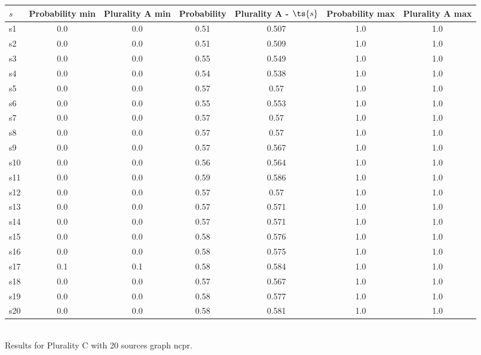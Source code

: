 \documentclass{article}
\begin{document}
\noindent\begin{tabular}{|l|c|c|c|c|c|c|}
\hline
$s$& Probability min & Plurality A min & Probability & Plurality A - $\ts{s}$ & Probability max & Plurality A max\\
\hline
s1 &0.0 & 0.0 & 0.51 & 0.507 & 1.0 & 1.0\\
\hline
s2 &0.0 & 0.0 & 0.51 & 0.509 & 1.0 & 1.0\\
\hline
s3 &0.0 & 0.0 & 0.55 & 0.549 & 1.0 & 1.0\\
\hline
s4 &0.0 & 0.0 & 0.54 & 0.538 & 1.0 & 1.0\\
\hline
s5 &0.0 & 0.0 & 0.57 & 0.57 & 1.0 & 1.0\\
\hline
s6 &0.0 & 0.0 & 0.55 & 0.553 & 1.0 & 1.0\\
\hline
s7 &0.0 & 0.0 & 0.57 & 0.57 & 1.0 & 1.0\\
\hline
s8 &0.0 & 0.0 & 0.57 & 0.57 & 1.0 & 1.0\\
\hline
s9 &0.0 & 0.0 & 0.57 & 0.567 & 1.0 & 1.0\\
\hline
s10 &0.0 & 0.0 & 0.56 & 0.564 & 1.0 & 1.0\\
\hline
s11 &0.0 & 0.0 & 0.59 & 0.586 & 1.0 & 1.0\\
\hline
s12 &0.0 & 0.0 & 0.57 & 0.57 & 1.0 & 1.0\\
\hline
s13 &0.0 & 0.0 & 0.57 & 0.571 & 1.0 & 1.0\\
\hline
s14 &0.0 & 0.0 & 0.57 & 0.571 & 1.0 & 1.0\\
\hline
s15 &0.0 & 0.0 & 0.58 & 0.576 & 1.0 & 1.0\\
\hline
s16 &0.0 & 0.0 & 0.58 & 0.575 & 1.0 & 1.0\\
\hline
s17 &0.1 & 0.1 & 0.58 & 0.584 & 1.0 & 1.0\\
\hline
s18 &0.0 & 0.0 & 0.57 & 0.567 & 1.0 & 1.0\\
\hline
s19 &0.0 & 0.0 & 0.58 & 0.577 & 1.0 & 1.0\\
\hline
s20 &0.0 & 0.0 & 0.58 & 0.581 & 1.0 & 1.0\\
\hline
\end{tabular}\\

\noindent Results for Plurality C with 20 sources graph ncpr.
\end{document}
